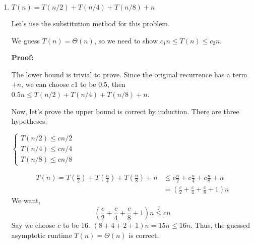 \documentclass[11pt]{article}
\theoremstyle{definition}
\theoremstyle{theorem}
\newcommand{\solution}{\medskip\noindent{\color{DarkBlue}\textbf{Solution:}}}
\begin{document}
\begin{enumerate}[label=(\alph*)]
\item $T(n) = T(n/2) + T(n/4) + T(n/8) + n$

\solution

Let's use the substitution method for this problem.

We guess $T(n) = \Theta (n)$, so we need to show $c_1 n \leq T(n) \leq c_2 n$.

\textbf{Proof:}

The lower bound is trivial to prove. Since the original recurrence has a term $+n$, we can choose $c1$ to be 0.5, then $0.5 n \leq T(n/2) + T(n/4) + T(n/8) + n$.

Now, let's prove the upper bound is correct by induction. 
There are three hypotheses:

\begin{math}
  \left\{
    \begin{array}{l}
      T(n/2) \leq cn/2 \\
      T(n/4) \leq cn/4 \\
      T(n/8) \leq cn/8
    \end{array}
  \right.
\end{math}

\[
\begin{split}
T(n) = T(\frac{n}{2}) + T(\frac{n}{4}) + T(\frac{n}{8}) + n 
& \leq c\frac{n}{2} + c\frac{n}{4} + c\frac{n}{8} + n \\
& = (\frac{c}{2} + \frac{c}{4} + \frac{c}{8} + 1)n
\end{split}
\]
We want,
\[
(\frac{c}{2} + \frac{c}{4} + \frac{c}{8} + 1)n \stackrel{?}{\leq} c n
\]
Say we choose $c$ to be 16. $(8 + 4 + 2 + 1)n = 15n \leq 16n$. Thus, the guessed asymptotic runtime $T(n) = \Theta (n)$ is correct.

\end{enumerate}
\end{document}
